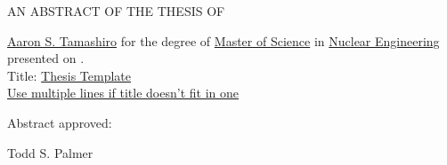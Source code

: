 
\begin{center} AN ABSTRACT OF THE THESIS OF  \end{center}

\thispagestyle{empty}

\belowSecSkip

\ResetSingleSpace

\noindent \underline{Aaron S. Tamashiro} for the degree of 
	  \underline{Master of Science} in
	  \underline{Nuclear Engineering} presented on 
	  \underline{\myDefenseDate}. \\
	  Title: \underline{Thesis Template} \\
      \hfill\underline{Use multiple lines if title doesn't fit in one}

\vskip0.3in

\noindent Abstract approved: \hspace{0.25in} \hrulefill\




	  
\noindent \hspace{3.25in} Todd S. Palmer \hfill

\vskip0.25in



\ResetDoubleSpace

\noindent
	\indent \lipsum[2-4]
    \indent \lipsum[1]
    
% 
% 
    
\thispagestyle{empty}
